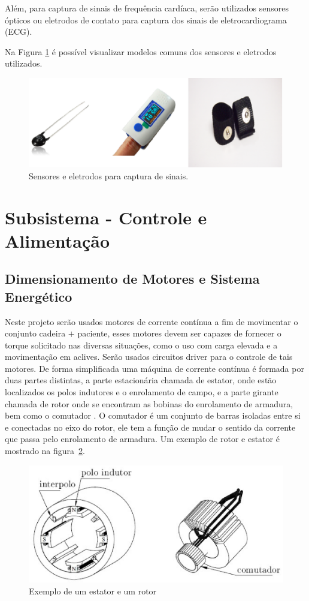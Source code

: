 Além, para captura de sinais de frequência cardíaca, serão utilizados sensores ópticos ou eletrodos de contato para captura dos sinais de eletrocardiograma (ECG).

Na Figura \ref{fig:sensors} é possível visualizar modelos comuns dos sensores e eletrodos utilizados.

\begin{figure}[H]
  \centering
    \includegraphics[width=\textwidth]{figuras/sensors.eps}
  \caption{Sensores e eletrodos para captura de sinais.}
  \label{fig:sensors}
\end{figure}

\section{Subsistema - Controle e Alimentação}
\subsection{Dimensionamento de Motores e Sistema Energético}
Neste projeto serão usados motores de corrente contínua a fim de movimentar o conjunto
cadeira $+$ paciente, esses motores devem ser capazes de fornecer o torque solicitado
nas diversas situações, como o uso com carga elevada e a movimentação em aclives.
Serão usados circuitos driver para o controle de tais motores. De forma simplificada
uma máquina de corrente contínua é formada por duas partes distintas, a parte
estacionária chamada de estator, onde estão localizados os polos indutores e o
enrolamento de campo, e a parte girante chamada de rotor onde se encontram as
bobinas do enrolamento de armadura, bem como o comutador  \cite{bim}. O comutador
é um conjunto de barras isoladas entre si e conectadas no eixo do rotor, ele tem
a função de mudar o sentido da corrente que passa pelo enrolamento de armadura.
Um exemplo de rotor e estator é mostrado na figura~\ref{fig:rotor}.

\begin{figure}[H]
  \centering
    \includegraphics[width=\textwidth]{figuras/rotor.eps}
  \caption{Exemplo de um estator e um rotor \cite{bim}}
  \label{fig:rotor}
\end{figure}

